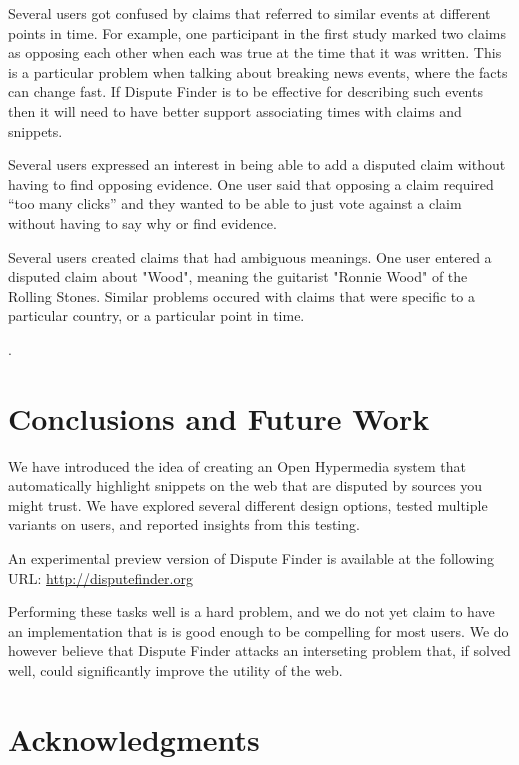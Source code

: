 \documentclass{www2010-submission}
\newcommand{\todo}[1]{}
\begin{document}
Several users got confused by claims that referred to similar events at different points in time. For example, one participant in the first study marked two claims as opposing each other when each was true at the time that it was written. This is a particular problem when talking about breaking news events, where the facts can change fast. If Dispute Finder is to be effective for describing such events then it will need to have better support associating times with claims and snippets.

Several users expressed an interest in being able to add a disputed claim without having to find opposing evidence. One user said that opposing a claim required ``too many clicks'' and they wanted to be able to just vote against a claim without having to say why or find evidence. 

Several users created claims that had ambiguous meanings. One user entered a disputed claim about "Wood", meaning the guitarist "Ronnie Wood" of the Rolling Stones. Similar problems occured with claims that were specific to a particular country, or a particular point in time. 

\todo{Need to say that the argumentation graph contains all existing claims and that it was a simple "supports"/"oppsose" graph.}.

\todo{Come up with terminology for marking an evidence snippet, and agree on evidence vs source vs article}
\todo{Talk about how the early versions conflated evidence and snippets - and whether it makes sense to distinguish between them}
\todo{Screenshot of the claim graph interface}


\section{Conclusions and Future Work}

We have introduced the idea of creating an Open Hypermedia system that automatically highlight snippets on the web that are disputed by sources you might trust. We have explored several different design options, tested multiple variants on users, and reported insights from this testing.

An experimental preview version of Dispute Finder is available at the following URL:
\url{http://disputefinder.org}

Performing these tasks well is a hard problem, and we do not yet claim to have an implementation that is is good enough to be compelling for most users. We do however believe that Dispute Finder attacks an interseting problem that, if solved well, could significantly improve the utility of the web.


\section{Acknowledgments}

\todo{Do we want to have acknowledgements}


\todo{Sort out bad references}

\end{document}
